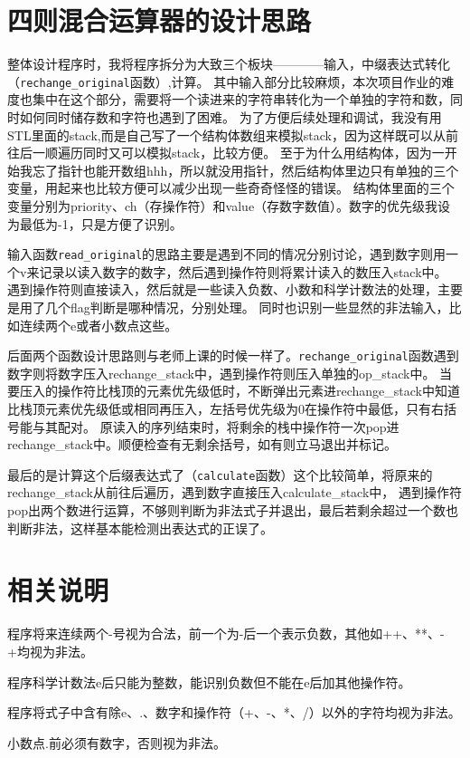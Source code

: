 \documentclass[UTF8]{ctexart}
\begin{document}
\pagestyle{fancy}
\fancyhead{}


\section{四则混合运算器的设计思路}

整体设计程序时，我将程序拆分为大致三个板块————输入，中缀表达式转化（\texttt{rechange\_original}函数）,计算。
其中输入部分比较麻烦，本次项目作业的难度也集中在这个部分，需要将一个读进来的字符串转化为一个单独的字符和数，同时如何同时储存数和字符也遇到了困难。
为了方便后续处理和调试，我没有用STL里面的stack,而是自己写了一个结构体数组来模拟stack，因为这样既可以从前往后一顺遍历同时又可以模拟stack，比较方便。
至于为什么用结构体，因为一开始我忘了指针也能开数组hhh，所以就没用指针，然后结构体里边只有单独的三个变量，用起来也比较方便可以减少出现一些奇奇怪怪的错误。
结构体里面的三个变量分别为priority、ch（存操作符）和value（存数字数值）。数字的优先级我设为最低为-1，只是方便了识别。\par

输入函数\texttt{read\_original}的思路主要是遇到不同的情况分别讨论，遇到数字则用一个v来记录以读入数字的数字，然后遇到操作符则将累计读入的数压入stack中。
遇到操作符则直接读入，然后就是一些读入负数、小数和科学计数法的处理，主要是用了几个flag判断是哪种情况，分别处理。
同时也识别一些显然的非法输入，比如连续两个e或者小数点这些。\par

后面两个函数设计思路则与老师上课的时候一样了。\texttt{rechange\_original}函数遇到数字则将数字压入rechange\_stack中，遇到操作符则压入单独的op\_stack中。
当要压入的操作符比栈顶的元素优先级低时，不断弹出元素进rechange\_stack中知道比栈顶元素优先级低或相同再压入，左括号优先级为0在操作符中最低，只有右括号能与其配对。
原读入的序列结束时，将剩余的栈中操作符一次pop进rechange\_stack中。顺便检查有无剩余括号，如有则立马退出并标记。\par

最后的是计算这个后缀表达式了（\texttt{calculate}函数）这个比较简单，将原来的rechange\_stack从前往后遍历，遇到数字直接压入calculate\_stack中，
遇到操作符pop出两个数进行运算，不够则判断为非法式子并退出，最后若剩余超过一个数也判断非法，这样基本能检测出表达式的正误了。

\section{相关说明}

程序将来连续两个-号视为合法，前一个为-后一个表示负数，其他如++、**、-+均视为非法。\par
程序科学计数法e后只能为整数，能识别负数但不能在e后加其他操作符。\par
程序将式子中含有除e、.、数字和操作符（+、-、*、/）以外的字符均视为非法。\par
小数点.前必须有数字，否则视为非法。
\end{document}
